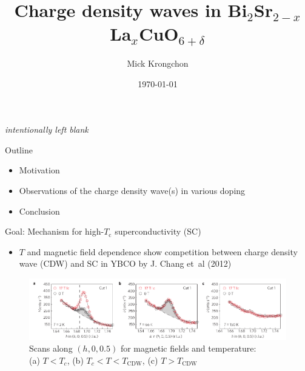 \documentclass{beamer}
\title[]{Charge density waves in Bi$_2$Sr$_{2-x}$La$_x$CuO$_{6 + \delta}$}
\author{Mick Krongchon}
\institute{University of Illinois at Urbana-Champaign}
\date{\today}
\begin{document}
\begin{frame}
\titlepage
\end{frame}

\begin{frame}
\centering
\textit{intentionally left blank}
\end{frame}

\begin{frame}{Outline}
\begin{itemize}
\item Motivation
\item Observations of the charge density wave(s) in various doping
\item Conclusion
\end{itemize}
\end{frame}

\begin{frame}{Goal: Mechanism for high-$T_\text{c}$ superconductivity (SC)}
\begin{itemize}
\item $T$ and magnetic field dependence show competition between charge density wave (CDW) and SC in YBCO by J. Chang et~al (2012)
\end{itemize}
\begin{figure}
\includegraphics[width=\textwidth]{figs/chang_1.pdf}
\caption*{Scans along $(h, 0, 0.5)$ for magnetic fields and temperature: \\(a) $T < T_c$, (b) $T_c < T < T_{\text{CDW}}$, (c) $T > T_{\text{CDW}}$}
\end{figure}
\end{frame}
\end{document}
